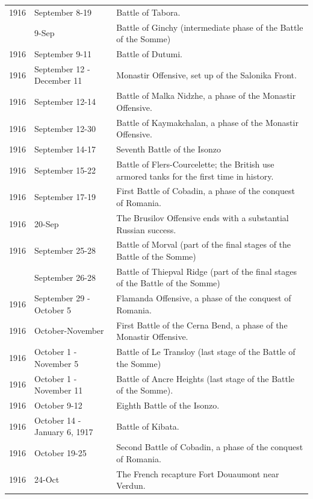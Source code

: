 \documentclass[
  openany]{book}
\begin{document}
\begin{longtable}[t]{rl>{\raggedright\arraybackslash}p{22em}}
\rowcolor{gray!6}  1916 & September 8-19 & Battle of Tabora.\\
\addlinespace
1916 & 9-Sep & Battle of Ginchy (intermediate phase of the Battle of the Somme)\\
\rowcolor{gray!6}  1916 & September 9-11 & Battle of Dutumi.\\
1916 & September 12 - December 11 & Monastir Offensive, set up of the Salonika Front.\\
\rowcolor{gray!6}  1916 & September 12-14 & Battle of Malka Nidzhe, a phase of the Monastir Offensive.\\
1916 & September 12-30 & Battle of Kaymakchalan, a phase of the Monastir Offensive.\\
\addlinespace
\rowcolor{gray!6}  1916 & September 14-17 & Seventh Battle of the Isonzo\\
1916 & September 15-22 & Battle of Flers-Courcelette; the British use armored tanks for the first time in history.\\
\rowcolor{gray!6}  1916 & September 17-19 & First Battle of Cobadin, a phase of the conquest of Romania.\\
1916 & 20-Sep & The Brusilov Offensive ends with a substantial Russian success.\\
\rowcolor{gray!6}  1916 & September 25-28 & Battle of Morval (part of the final stages of the Battle of the Somme)\\
\addlinespace
1916 & September 26-28 & Battle of Thiepval Ridge (part of the final stages of the Battle of the Somme)\\
\rowcolor{gray!6}  1916 & September 29 - October 5 & Flamanda Offensive, a phase of the conquest of Romania.\\
1916 & October-November & First Battle of the Cerna Bend, a phase of the Monastir Offensive.\\
\rowcolor{gray!6}  1916 & October 1 - November 5 & Battle of Le Transloy (last stage of the Battle of the Somme)\\
1916 & October 1 - November 11 & Battle of Ancre Heights (last stage of the Battle of the Somme).\\
\addlinespace
\rowcolor{gray!6}  1916 & October 9-12 & Eighth Battle of the Isonzo.\\
1916 & October 14 - January 6, 1917 & Battle of Kibata.\\
\rowcolor{gray!6}  1916 & October 19-25 & Second Battle of Cobadin, a phase of the conquest of Romania.\\
1916 & 24-Oct & The French recapture Fort Douaumont near Verdun.\\

\end{longtable}
\end{document}
